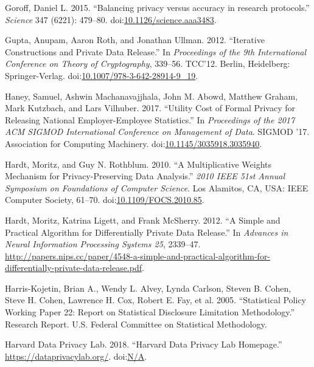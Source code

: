 \documentclass[]{article}
\begin{document}
\hypertarget{ref-Goroff2015}{}
Goroff, Daniel L. 2015. ``Balancing privacy versus accuracy in research
protocols.'' \emph{Science} 347 (6221): 479--80.
doi:\href{https://doi.org/10.1126/science.aaa3483}{10.1126/science.aaa3483}.

\hypertarget{ref-Gupta:2012:ICP:2238936.2238961}{}
Gupta, Anupam, Aaron Roth, and Jonathan Ullman. 2012. ``Iterative
Constructions and Private Data Release.'' In \emph{Proceedings of the
9th International Conference on Theory of Cryptography}, 339--56.
TCC'12. Berlin, Heidelberg: Springer-Verlag.
doi:\href{https://doi.org/10.1007/978-3-642-28914-9_19}{10.1007/978-3-642-28914-9\_19}.

\hypertarget{ref-HaneySIGMOD2017}{}
Haney, Samuel, Ashwin Machanavajjhala, John M. Abowd, Matthew Graham,
Mark Kutzbach, and Lars Vilhuber. 2017. ``Utility Cost of Formal Privacy
for Releasing National Employer-Employee Statistics.'' In
\emph{Proceedings of the 2017 ACM SIGMOD International Conference on
Management of Data}. SIGMOD '17. Association for Computing Machinery.
doi:\href{https://doi.org/10.1145/3035918.3035940}{10.1145/3035918.3035940}.

\hypertarget{ref-Hardt:Multiplicative:FOCS10}{}
Hardt, Moritz, and Guy N. Rothblum. 2010. ``A Multiplicative Weights
Mechanism for Privacy-Preserving Data Analysis.'' \emph{2010 IEEE 51st
Annual Symposium on Foundations of Computer Science}. Los Alamitos, CA,
USA: IEEE Computer Society, 61--70.
doi:\href{https://doi.org/10.1109/FOCS.2010.85}{10.1109/FOCS.2010.85}.

\hypertarget{ref-Hardt:Simple:NIPS:2012}{}
Hardt, Moritz, Katrina Ligett, and Frank McSherry. 2012. ``A Simple and
Practical Algorithm for Differentially Private Data Release.'' In
\emph{Advances in Neural Information Processing Systems 25}, 2339--47.
\url{http://papers.nips.cc/paper/4548-a-simple-and-practical-algorithm-for-differentially-private-data-release.pdf}.

\hypertarget{ref-spwp22}{}
Harris-Kojetin, Brian A., Wendy L. Alvey, Lynda Carlson, Steven B.
Cohen, Steve H. Cohen, Lawrence H. Cox, Robert E. Fay, et al. 2005.
``Statistical Policy Working Paper 22: Report on Statistical Disclosure
Limitation Methodology.'' Research Report. U.S. Federal Committee on
Statistical Methodology.

\hypertarget{ref-Harvard:DataPrivacyLab}{}
Harvard Data Privacy Lab. 2018. ``Harvard Data Privacy Lab Homepage.''
\url{https://dataprivacylab.org/}. doi:\href{https://doi.org/N/A}{N/A}.
\end{document}
